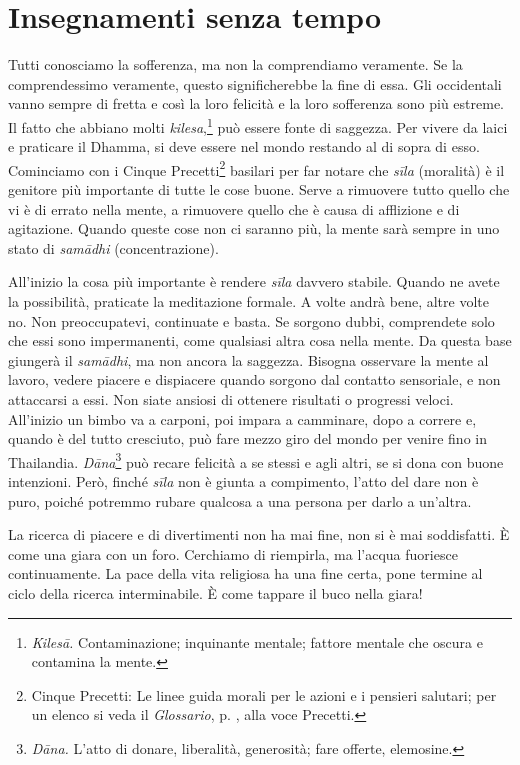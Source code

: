 \chapter{Insegnamenti senza tempo}

Tutti conosciamo la sofferenza, ma non la comprendiamo veramente. Se la
comprendessimo veramente, questo significherebbe la fine di essa. Gli
occidentali vanno sempre di fretta e così la loro felicità e la loro
sofferenza sono più estreme. Il fatto che abbiano molti
\emph{kilesa},\footnote{\emph{Kilesā.} Contaminazione; inquinante
  mentale; fattore mentale che oscura e contamina la mente.} può essere
fonte di saggezza. Per vivere da laici e praticare il Dhamma, si deve
essere nel mondo restando al di sopra di esso. Cominciamo con i Cinque
Precetti\footnote{Cinque Precetti: Le linee guida morali per le azioni e
  i pensieri salutari; per un elenco si veda il \emph{Glossario}, p. \pageref{glossary-precetti}, alla
  voce Precetti.} basilari per far notare che \emph{sīla} (moralità)
è il genitore più importante di tutte le
cose buone. Serve a rimuovere tutto quello che vi è di errato nella
mente, a rimuovere quello che è causa di afflizione e di agitazione.
Quando queste cose non ci saranno più, la mente sarà sempre in uno stato
di \emph{samādhi} (concentrazione).

All'inizio la cosa più importante è rendere \emph{sīla} davvero stabile.
Quando ne avete la possibilità, praticate la meditazione formale. A
volte andrà bene, altre volte no. Non preoccupatevi, continuate e basta.
Se sorgono dubbi, comprendete solo che essi sono impermanenti, come
qualsiasi altra cosa nella mente. Da questa base giungerà il
\emph{samādhi}, ma non ancora la saggezza. Bisogna osservare la mente al
lavoro, vedere piacere e dispiacere quando sorgono dal contatto
sensoriale, e non attaccarsi a essi. Non siate ansiosi di ottenere
risultati o progressi veloci. All'inizio un bimbo va a carponi, poi
impara a camminare, dopo a correre e, quando è del tutto cresciuto, può
fare mezzo giro del mondo per venire fino in Thailandia.
\emph{Dāna}\footnote{\emph{Dāna.} L'atto di donare, liberalità,
  generosità; fare offerte, elemosine.} può recare felicità a se stessi
e agli altri, se si dona con buone intenzioni. Però, finché \emph{sīla}
non è giunta a compimento, l'atto del dare non è puro, poiché potremmo
rubare qualcosa a una persona per darlo a un'altra.

La ricerca di piacere e di divertimenti non ha mai fine, non si è mai
soddisfatti. È come una giara con un foro. Cerchiamo di riempirla, ma
l'acqua fuoriesce continuamente. La pace della vita religiosa ha una
fine certa, pone termine al ciclo della ricerca interminabile. È come
tappare il buco nella giara!

